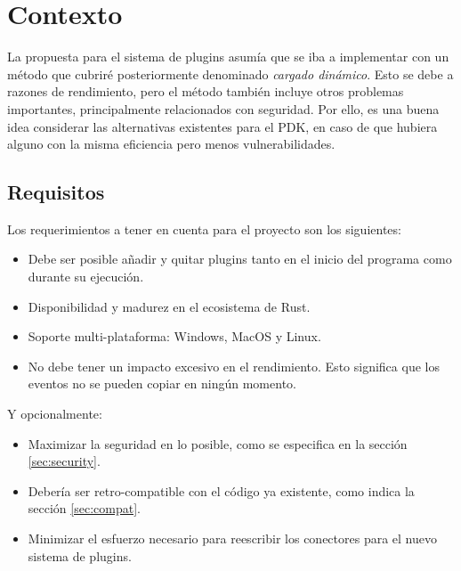 
\chapter{Contexto}\label{sec:investigation}

La propuesta para el sistema de plugins asumía que se iba a implementar con un
método que cubriré posteriormente denominado \emph{cargado dinámico}. Esto se
debe a razones de rendimiento, pero el método también incluye otros problemas
importantes, principalmente relacionados con seguridad. Por ello, es una buena
idea considerar las alternativas existentes para el PDK, en caso de que hubiera
alguno con la misma eficiencia pero menos vulnerabilidades.

\section{Requisitos}

Los requerimientos a tener en cuenta para el proyecto son los siguientes:

\begin{itemize}
    \item Debe ser posible añadir y quitar plugins tanto en el inicio del
        programa como durante su ejecución.

    \item Disponibilidad y madurez en el ecosistema de Rust.

    \item Soporte multi-plataforma: Windows, MacOS y Linux.

    \item No debe tener un impacto excesivo en el rendimiento. Esto significa
        que los eventos no se pueden copiar en ningún momento.

\end{itemize}

Y opcionalmente:

\begin{itemize}
    \item Maximizar la seguridad en lo posible, como se especifica en la sección
        \ref{sec:security}.

    \item Debería ser retro-compatible con el código ya existente, como indica la
        sección \ref{sec:compat}.

    \item Minimizar el esfuerzo necesario para reescribir los conectores para el
        nuevo sistema de plugins.

\end{itemize}

